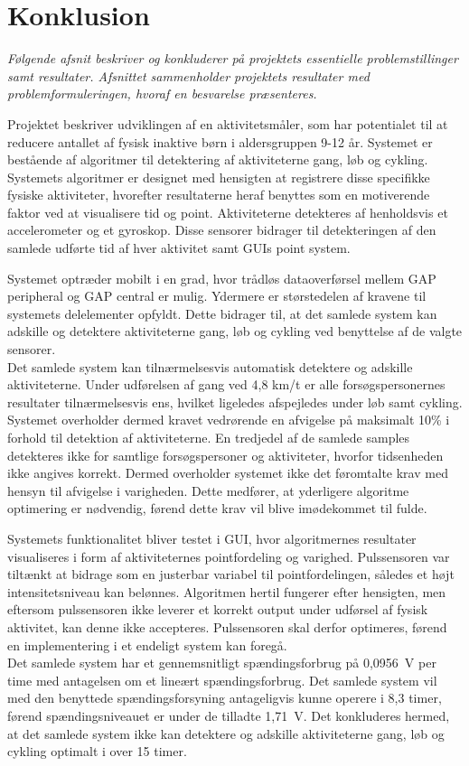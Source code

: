 \section{Konklusion}
\textit{Følgende afsnit beskriver og konkluderer på projektets essentielle problemstillinger samt resultater. Afsnittet sammenholder projektets resultater med problemformuleringen, hvoraf en besvarelse præsenteres.}

Projektet beskriver udviklingen af en aktivitetsmåler, som har potentialet til at reducere antallet af fysisk inaktive børn i aldersgruppen 9-12 år. Systemet er bestående af algoritmer til detektering af aktiviteterne gang, løb og cykling. Systemets algoritmer er designet med hensigten at registrere disse specifikke fysiske aktiviteter, hvorefter resultaterne heraf benyttes som en motiverende faktor ved at visualisere tid og point. Aktiviteterne detekteres af henholdsvis et accelerometer og et gyroskop. Disse sensorer bidrager til detekteringen af den samlede udførte tid af hver aktivitet samt GUIs point system.

Systemet optræder mobilt i en grad, hvor trådløs dataoverførsel mellem GAP peripheral og GAP central er mulig. Ydermere er størstedelen af kravene til systemets delelementer opfyldt. Dette bidrager til, at det samlede system kan adskille og detektere aktiviteterne gang, løb og cykling ved benyttelse af de valgte sensorer. \\
Det samlede system kan tilnærmelsesvis automatisk detektere og adskille aktiviteterne. Under udførelsen af gang ved 4,8 km/t er alle forsøgspersonernes resultater tilnærmelsesvis ens, hvilket ligeledes afspejledes under løb samt cykling. Systemet overholder dermed kravet vedrørende en afvigelse på maksimalt 10\% i forhold til detektion af aktiviteterne. En tredjedel af de samlede samples detekteres ikke for samtlige forsøgspersoner og aktiviteter, hvorfor tidsenheden ikke angives korrekt. Dermed overholder systemet ikke det føromtalte krav med hensyn til afvigelse i varigheden. Dette medfører, at yderligere algoritme optimering er nødvendig, førend dette krav vil blive imødekommet til fulde.

Systemets funktionalitet bliver testet i GUI, hvor algoritmernes resultater visualiseres i form af aktiviteternes pointfordeling og varighed. Pulssensoren var tiltænkt at bidrage som en justerbar variabel til pointfordelingen, således et højt intensitetsniveau kan belønnes. Algoritmen hertil fungerer efter hensigten, men eftersom pulssensoren ikke leverer et korrekt output under udførsel af fysisk aktivitet, kan denne ikke accepteres. Pulssensoren skal derfor optimeres, førend en implementering i et endeligt system kan foregå. \\
Det samlede system har et gennemsnitligt spændingsforbrug på 0,0956~V per time med antagelsen om et lineært spændingsforbrug. Det samlede system vil med den benyttede spændingsforsyning antageligvis kunne operere i 8,3 timer, førend spændingsniveauet er under de tilladte 1,71~V. Det konkluderes hermed, at det samlede system ikke kan detektere og adskille aktiviteterne gang, løb og cykling optimalt i over 15 timer. 


